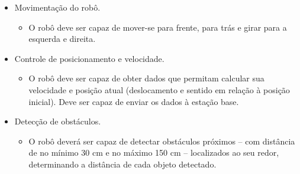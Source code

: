 \begin{itemize} %

  \item Movimentação do robô.
    \begin{itemize}
      \item O robô deve ser capaz de mover-se para frente, para trás e girar para a esquerda e direita.
    \end{itemize}

  \item Controle de posicionamento e velocidade.
    \begin{itemize}
      \item O robô deve ser capaz de obter dados que permitam calcular sua velocidade e posição atual (deslocamento e sentido em relação à posição inicial). Deve ser capaz de enviar os dados à estação base.
    \end{itemize}

  \item Detecção de obstáculos.
    \begin{itemize}
      \item O robô deverá ser capaz de detectar obstáculos próximos -- com distância de no mínimo 30 cm e no máximo 150 cm -- localizados ao seu redor, determinando a distância de cada objeto detectado.
    \end{itemize}

\end{itemize} %

